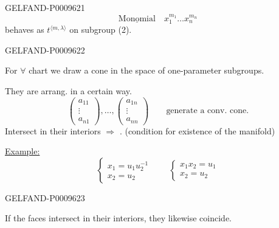 \begin{GelfandAdjacentEvidence}{GELFAND-P000962}{1}
\begin{equation*}
 \underline{\text{Monomial}}\quad x_1^{m_1}\ldots x_n^{m_n}\tag{3}
\end{equation*}
behaves as $t^{\langle m,\lambda\rangle}$ on subgroup (2).
\end{GelfandAdjacentEvidence}
\begin{GelfandAdjacentEvidence}{GELFAND-P000962}{2}


For $\forall$ chart we draw a cone in the space of one-parameter subgroups.

They are arrang. in a certain way.
\[
 \begin{pmatrix}a_{11}\\ \vdots\\ a_{n1}\end{pmatrix},\ldots,
 \begin{pmatrix}a_{1n}\\ \vdots\\ a_{nn}\end{pmatrix}
 \qquad\text{generate a conv. cone.}
\]
Intersect in their interiors $\Rightarrow$ . (condition for existence of the manifold)

\underline{Example:}
\[
 \begin{cases}
 x_1=u_1u_2^{-1}\\
 x_2=u_2
 \end{cases}
 \qquad
 \begin{cases}
 x_1x_2=u_1\\
 x_2=u_2
 \end{cases}
\]

\end{GelfandAdjacentEvidence}
\begin{GelfandAdjacentEvidence}{GELFAND-P000962}{3}


If the faces intersect in their interiors, they likewise coincide.
\end{GelfandAdjacentEvidence}
